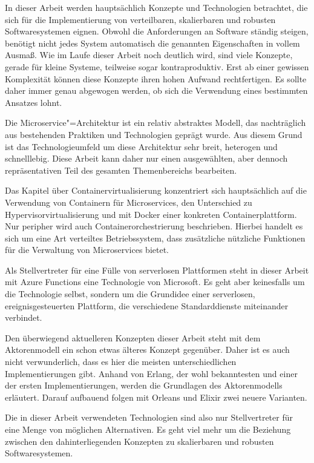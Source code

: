 In dieser Arbeit werden hauptsächlich Konzepte und Technologien betrachtet, die sich für die Implementierung von verteilbaren, skalierbaren und robusten Softwaresystemen eignen. Obwohl die Anforderungen an Software ständig steigen, benötigt nicht jedes System automatisch die genannten Eigenschaften in vollem Ausmaß. Wie im Laufe dieser Arbeit noch deutlich wird, sind viele Konzepte, gerade für kleine Systeme, teilweise sogar kontraproduktiv. Erst ab einer gewissen Komplexität können diese Konzepte ihren hohen Aufwand rechtfertigen. Es sollte daher immer genau abgewogen werden, ob sich die Verwendung eines bestimmten Ansatzes lohnt.

Die Microservice"=Architektur ist ein relativ abstraktes Modell, das nachträglich aus bestehenden Praktiken und Technologien geprägt wurde. Aus diesem Grund ist das Technologieumfeld um diese Architektur sehr breit, heterogen und schnelllebig. Diese Arbeit kann daher nur einen ausgewählten, aber dennoch repräsentativen Teil des gesamten Themenbereichs bearbeiten.

Das Kapitel über Containervirtualisierung konzentriert sich hauptsächlich auf die Verwendung von Containern für Microservices, den Unterschied zu Hypervisorvirtualisierung und mit Docker einer konkreten Containerplattform. Nur peripher wird auch Containerorchestrierung beschrieben. Hierbei handelt es sich um eine Art verteiltes Betriebssystem, dass zusätzliche nützliche Funktionen für die Verwaltung von Microservices bietet.

Als Stellvertreter für eine Fülle von serverlosen Plattformen steht in dieser Arbeit mit Azure Functions eine Technologie von Microsoft. Es geht aber keinesfalls um die Technologie selbst, sondern um die Grundidee einer serverlosen, ereignisgesteuerten Plattform, die verschiedene Standarddienste miteinander verbindet.

Den überwiegend aktuelleren Konzepten dieser Arbeit steht mit dem Aktorenmodell ein schon etwas älteres Konzept gegenüber. Daher ist es auch nicht verwunderlich, dass es hier die meisten unterschiedlichen Implementierungen gibt. Anhand von Erlang, der wohl bekanntesten und einer der ersten Implementierungen, werden die Grundlagen des Aktorenmodells erläutert. Darauf aufbauend folgen mit Orleans und Elixir zwei neuere Varianten.

Die in dieser Arbeit verwendeten Technologien sind also nur Stellvertreter für eine Menge von möglichen Alternativen. Es geht viel mehr um die Beziehung zwischen den dahinterliegenden Konzepten zu skalierbaren und robusten Softwaresystemen.